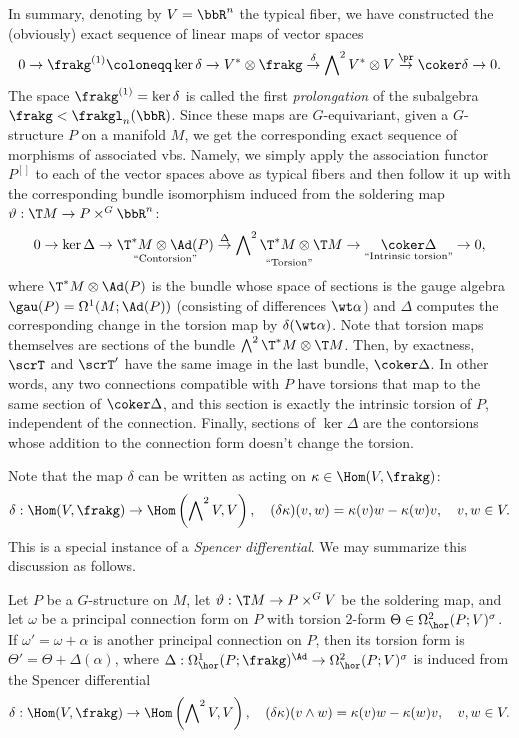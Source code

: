 In summary, denoting by $V=\bbR^n$ the typical fiber, we have constructed the (obviously) exact sequence of linear maps of vector spaces
\[0\to\frakg^{(1)}\coloneqq\ker\delta\to V^\ast\otimes\frakg\overset{\delta}{\to}\bigwedge\nolimits^2 V^\ast \otimes V\overset{\pr}{\to}\coker\delta\to 0.\]
The space $\frakg^{(1)}=\ker\delta$ is called the first \emph{prolongation} of the subalgebra $\frakg<\frakgl_n(\bbR)$. Since these maps are $G$-equivariant, given a $G$-structure $P$ on a manifold $M$, we get the corresponding exact sequence of morphisms of associated \glspl{vb}. Namely, we simply apply the association functor $P^{[]}$ to each of the vector spaces above as typical fibers and then follow it up with the corresponding bundle isomorphism induced from the soldering map $\vartheta:\T M\to P\times^G \bbR^n$:
\[ 0\to \ker \Delta \to \underset{\text{``Contorsion''}}{\T^\ast M\otimes \Ad(P)}\overset{\Delta}{\to} \underset{\text{``Torsion''}}{\bigwedge\nolimits^2 \T^\ast M\otimes \T M}\to \underset{\text{``Intrinsic torsion''}}{\coker \Delta}\to 0,\]
where $ \T^\ast M\otimes \Ad(P)$ is the bundle whose space of sections is the gauge algebra $\gau(P)=\Omega^1(M;\Ad(P))$ (consisting of differences $\wt\alpha$) and $\Delta$ computes  the corresponding change in the torsion map by $\delta(\wt\alpha)$. Note that torsion maps themselves are sections of the bundle $\bigwedge\nolimits^2 \T^\ast M\otimes \T M$. Then, by exactness, $\scrT$ and $\scrT'$ have the same image in the last bundle, $\coker\Delta$. In other words, any two connections compatible with $P$ have torsions that map to the same section of $\coker\Delta$, and this section is exactly the intrinsic torsion of $P$, independent of the connection. Finally, sections of $\ker\Delta$ are the contorsions whose addition to the connection form doesn't change the torsion.

Note that the map $\delta$ can be written as acting on $\kappa\in\Hom(V,\frakg)$:
\[\delta:\Hom(V,\frakg)\to \Hom\left(\bigwedge\nolimits^2 V,V\right),\quad (\delta\kappa)(v,w)=\kappa(v) w-\kappa(w) v,\quad v,w\in V.\]
This is a special instance  of a \emph{Spencer differential}. We may summarize this discussion as follows.

\begin{prop}
    Let $P$ be a $G$-structure on $M$, let $\vartheta:\T M\to P\times^G V$ be the soldering map, and let $\omega$ be a principal connection form on $P$ with torsion $2$-form $\Theta\in\Omega^2_{\hor}(P;V)^\sigma$. If $\omega'=\omega+\alpha$ is another principal connection on $P$, then its torsion form is $\Theta'=\Theta+\Delta(\alpha)$, where $\Delta:\Omega^1_{\hor}(P;\frakg)^\Ad\to \Omega^2_{\hor}(P;V)^\sigma$ is induced from the Spencer differential 
    \[\delta:\Hom(V,\frakg)\to \Hom\left(\bigwedge\nolimits^2 V,V\right),\quad (\delta\kappa) (v\wedge w)=\kappa(v)w-\kappa(w)v,\quad v,w\in V.\]
\end{prop}

